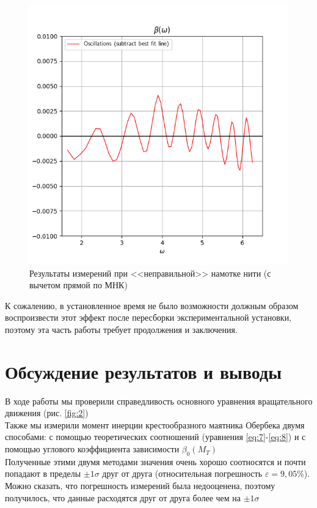 \documentclass[a4paper,12pt]{article}
\begin{document}
	\begin{figure}[H]
		\centering
		\caption{Результаты измерений при <<неправильной>> намотке нити (с вычетом прямой по МНК)}
		\label{fig:fig4}
		\includegraphics[width=0.65\linewidth]{fig_4}
	\end{figure}
	
	
	К сожалению, в установленное время не было возможности должным образом воспроизвести этот эффект после пересборки экспериментальной установки, поэтому эта часть работы требует продолжения и заключения.
	
	
	\section{Обсуждение результатов и выводы}
	
	В ходе работы мы проверили справедливость основного уравнения вращательного движения (рис. \ref{fig:2}) \\
	
	Также мы измерили момент инерции крестообразного маятника Обербека двумя способами: с помощью теоретических соотношений (уравнения \eqref{eq:7}-\eqref{eq:8}) и с помощью углового коэффициента зависимости $\beta_0(M_T)$\\
	
	Полученные этими двумя методами значения очень хорошо соотносятся и почти попадают в пределы $\pm 1\sigma$ друг от друга (относительная погрешность $\varepsilon=9,05\%$). Можно сказать, что погрешность измерений была недооценена, поэтому получилось, что данные расходятся друг от друга более чем на $\pm 1 \sigma$\\
	
\end{document}
